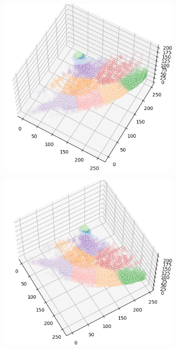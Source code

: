 \begin{figure}[htbp]
\begin{subfigure}[t]{0.32\textwidth}
    \end{subfigure}
    \begin{subfigure}[t]{0.32\textwidth}
        \includegraphics[width=\linewidth]{../../python_code/plots/kmeans/flower-14/clusters_elev60_azim-60.png}
    \end{subfigure}
    \begin{subfigure}[t]{0.32\textwidth}
        \includegraphics[width=\linewidth]{../../python_code/plots/kmeans/flower-14/clusters_elev60_azim-30.png}

\end{subfigure}
\end{figure}
